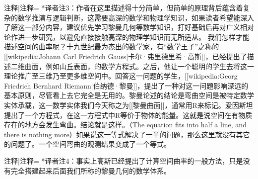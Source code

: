 \documentclass[12pt,a4paper,twoside]{ctexrep}
\begin{document}
{{注释|注释=
*译者注3：作者在这里描述得十分简单，但简单的原理背后蕴含着复杂的数学推演与逻辑判断，这需要高深的数学和物理学知识，如果读者希望能深入了解这一部分内容，建议优先学习黎曼几何等数学知识，打好基础后再对广义相对论作进一步研究，以避免直接接触高深的物理学知识而无所适从。
}}
    我们怎样才能描述空间的曲率呢？十九世纪最为杰出的数学家，有“数学王子”之称的[[wikipedia:Johann Carl Friedrich Gauss|卡尔·弗里德里希·高斯]]，已经提出了描述二维曲面，例如山丘表面，的数学方程式。之后，他让一个聪明的学生去将这一理论推广至三维乃至更多维空间中。回答这一问题的学生，[[wikipedia:Georg Friedrich Bernhard Riemann|伯纳德·黎曼]]，提出了一种对这一问题影响深远的基本原则，尽管看上去它完全是无用的。黎曼论述的结论是弯曲空间是被特定数学实体承载，这一数学实体我们今天称之为[[黎曼曲面]]，通常用R来标记。爱因斯坦提出了一个方程式，在这一方程式中R等价于物体的能量。这就是说空间在有物质存在的地方会发生弯曲。结论就是这样。（The equation fits into half a line, and there is nothing more）如果说这一等式解决了一半的问题，那么这里就没有其它的问题了。一个空间弯曲的观测结果变成了一个等式。

{{注释|注释=
*译者注4：事实上高斯已经提出了计算空间曲率的一般方法，只是没有完全搭建起来后面我们所称的黎曼几何的数学体系。
}}
\end{document}
